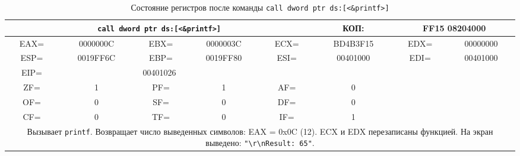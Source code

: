 \begin{table}[H]
    \centering
    \caption{Состояние регистров после команды \texttt{call dword ptr ds:[<\&printf>]}}
    \label{tab:after_call_printf}
    \small
    \renewcommand{\arraystretch}{1.3}
    \begin{tabular}{|c|c|c|c|c|c|c|c|}
    \hline
    \multicolumn{5}{|c|}{\cellcolor{green!40}\textbf{\texttt{call dword ptr ds:[<\&printf>]}}} & \cellcolor{green!20} КОП: & \multicolumn{2}{c|}{\cellcolor{green!20} FF15 08204000} \\
    \hline
    \cellcolor{blue!30} EAX= & \cellcolor{red!70} 0000000C & \cellcolor{blue!30} EBX= & 0000003C & \cellcolor{blue!30} ECX= & \cellcolor{red!70} BD4B3F15 & \cellcolor{blue!30} EDX= & \cellcolor{red!70} 00000000 \\
    \hline
    \cellcolor{blue!30} ESP= & 0019FF6C & \cellcolor{blue!30} EBP= & 0019FF80 & \cellcolor{blue!30} ESI= & 00401000 & \cellcolor{blue!30} EDI= & 00401000 \\
    \hline
    \cellcolor{blue!30} EIP= & \multicolumn{3}{c|}{\cellcolor{red!70} 00401026} & \multicolumn{4}{c|}{} \\
    \hline
    \cellcolor{pink} ZF= & \cellcolor{red!70} 1 & \cellcolor{pink} PF= & 1 & \cellcolor{pink} AF= & \cellcolor{red!70} 0 & \multicolumn{2}{c|}{\cellcolor{gray!50}} \\
    \cline{1-6}
    \cellcolor{pink} OF= & 0 & \cellcolor{pink} SF= & 0 & \cellcolor{pink} DF= & 0 & \multicolumn{2}{c|}{\cellcolor{gray!50}} \\
    \cline{1-6}
    \cellcolor{pink} CF= & 0 & \cellcolor{pink} TF= & 0 & \cellcolor{pink} IF= & 1 & \multicolumn{2}{c|}{\cellcolor{gray!50}} \\
    \hline
    \multicolumn{8}{|p{14cm}|}{Вызывает \texttt{printf}. Возвращает число выведенных символов: EAX = 0x0C (12). ECX и EDX перезаписаны функцией. На экран выведено: \texttt{"\textbackslash r\textbackslash nResult: 65"}.} \\
    \hline
    \end{tabular}
\end{table}

